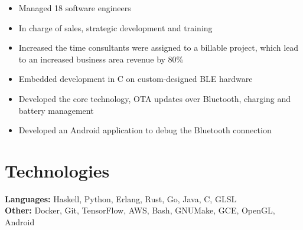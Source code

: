 \documentclass{cv_doc}
\begin{document}

\begin{itemize}[label={\tiny\raisebox{1ex}{\textbullet}}]
  \item {Managed 18 software engineers}
  \item {In charge of sales, strategic development and training}
  \item {Increased the time consultants were assigned to a billable project,
  which lead to an increased business area revenue by 80\%}
\end{itemize}


\begin{itemize}[label={\tiny\raisebox{1ex}{\textbullet}}]
  \item {Embedded development in C on custom-designed BLE hardware}
  \item {Developed the core technology, OTA updates over Bluetooth, charging
  and battery management}
  \item {Developed an Android application to debug the Bluetooth connection}
\end{itemize}

\section*{Technologies}

\textbf{Languages:} Haskell, Python, Erlang, Rust, Go, Java, C, GLSL \\
\textbf{Other:} Docker, Git, TensorFlow, AWS, Bash, GNUMake, GCE, OpenGL,
Android
\end{document}
